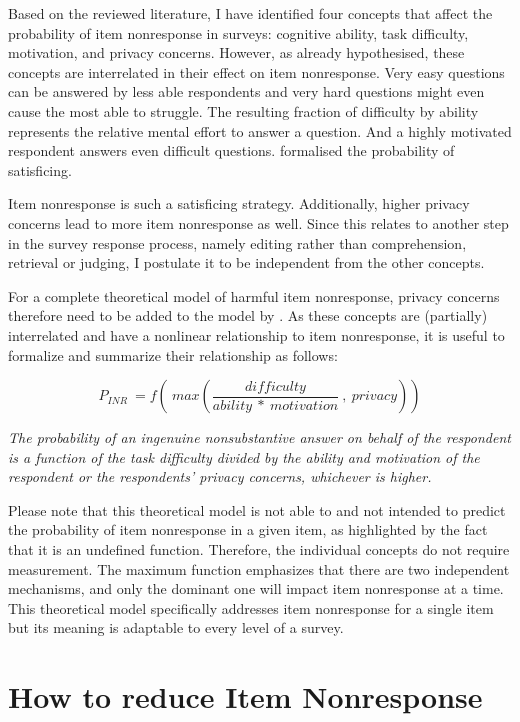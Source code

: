 \documentclass[a4paper,12pt]{article}
\begin{document}
\bigskip

Based on the reviewed literature, I have identified four concepts that affect the probability of item nonresponse in surveys: cognitive ability, task difficulty, motivation, and privacy concerns. However, as \citet{krosnickResponseStrategiesCoping1991} already hypothesised, these concepts are interrelated in their effect on item nonresponse. Very easy questions can be answered by less able respondents and very hard questions might even cause the most able to struggle. The resulting fraction of difficulty by ability represents the relative mental effort to answer a question. And a highly motivated respondent answers even difficult questions. \citet[225]{krosnickResponseStrategiesCoping1991} formalised the probability of satisficing. 

Item nonresponse is such a satisficing strategy. Additionally, higher privacy concerns lead to more item nonresponse as well. Since this relates to another step in the survey response process, namely editing rather than comprehension, retrieval or judging, I postulate it to be independent from the other concepts. 

For a complete theoretical model of harmful item nonresponse, privacy concerns therefore need to be added to the model by \citet{krosnickResponseStrategiesCoping1991}. As these concepts are (partially) interrelated and have a nonlinear relationship to item nonresponse, it is useful to formalize and summarize their relationship as follows:

$$ P_{INR} \ = f\left(\ max \left( \frac{difficulty}{ability \ * \ motivation} \ , \ privacy \right)\right) $$

\textit{The probability of an ingenuine nonsubstantive answer on behalf of the respondent is a function of the task difficulty divided by the ability and motivation of the respondent or the respondents' privacy concerns, whichever is higher.}

Please note that this theoretical model is not able to and not intended to predict the probability of item nonresponse in a given item, as highlighted by the fact that it is an undefined function. Therefore, the individual concepts do not require measurement. The maximum function emphasizes that there are two independent mechanisms, and only the dominant one will impact item nonresponse at a time. This theoretical model specifically addresses item nonresponse for a single item but its meaning is adaptable to every level of a survey.


\section{How to reduce Item Nonresponse}
\end{document}
